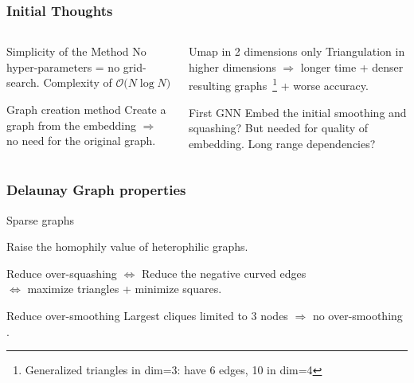 \documentclass[10pt, aspectratio = 169]{beamer}
\begin{document}
\begin{frame}
    \frametitle{Initial Thoughts}
    \begin{columns}
        \begin{column}{0.5\textwidth}
            \begin{block}{Simplicity of the Method}
                No hyper-parameters = no grid-search. 
                Complexity of $\mathcal{O} \big( N \log N \big)$
            \end{block}
            \begin{block}{Graph creation method}
                Create a graph from the embedding $\Rightarrow$ no need for the original graph.
            \end{block}
        \end{column}
        \begin{column}{0.5\textwidth}
            \begin{alertblock}{Umap in 2 dimensions only}
                Triangulation in higher dimensions $\Rightarrow$ longer time + denser resulting 
                graphs~\footnote{Generalized triangles in dim=3: have 6 edges, 10 in dim=4} + worse accuracy.
            \end{alertblock}
            \begin{alertblock}{First GNN}
                Embed the initial smoothing and squashing? But needed for quality of 
                embedding. Long range dependencies? 
            \end{alertblock}
        \end{column}
    \end{columns}

\end{frame}

\begin{frame}
    \frametitle{Delaunay Graph properties}
    Sparse graphs

    Raise the homophily value of heterophilic graphs.

    \begin{block}{Reduce over-squashing}
        $\iff$ Reduce the negative curved edges \\$\iff$ maximize triangles + minimize squares.
    \end{block}
    \begin{block}{Reduce over-smoothing}
        Largest cliques limited to 3 nodes $\Rightarrow$ no over-smoothing \cite[Nguyen et al, 2023]{nguyen2023revisiting}.
    \end{block}
\end{frame}
\end{document}
